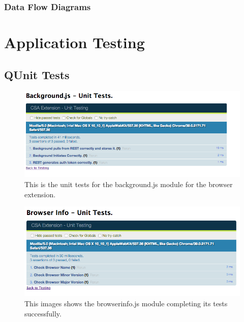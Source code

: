 \documentclass{article}
\begin{document}
\subsubsection{Data Flow Diagrams}


\newpage
\section{Application Testing}

\subsection{QUnit Tests}

\begin{figure}[H]
\centering
\includegraphics[width=\textwidth]{backgroundqunit}
\caption{This is the unit tests for the background.js module for the browser extension.}
\end{figure}

\begin{figure}[H]
\centering
\includegraphics[width=\textwidth]{biqunit}
\caption{This images shows the browserinfo.js module completing its tests successfully.}
\end{figure}
\end{document}
